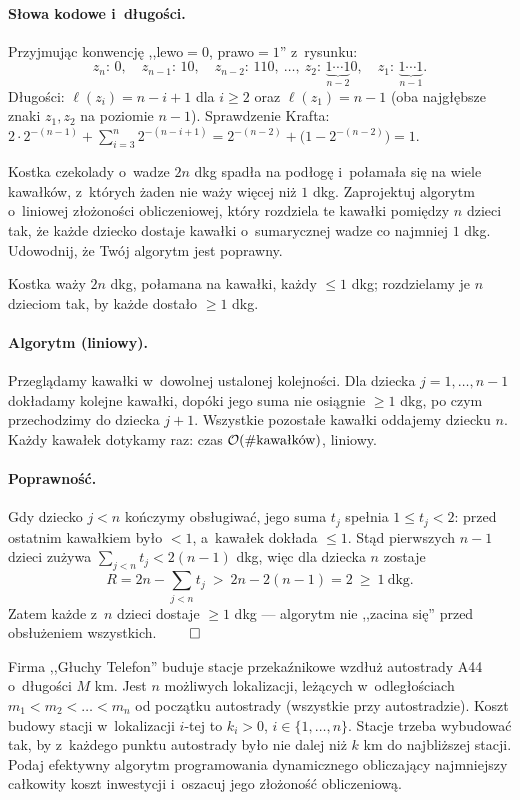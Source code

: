\paragraph{Słowa kodowe i~długości.}
Przyjmując konwencję ,,lewo${}=0$, prawo${}=1$'' z~rysunku:
\[
	z_n\!:\,0,\quad z_{n-1}\!:\,10,\quad z_{n-2}\!:\,110,\ \dots,\
	z_2\!:\,\underbrace{1\cdots1}_{n-2}0,\quad z_1\!:\,\underbrace{1\cdots1}_{n-1}.
\]
Długości: $\ell(z_i)=n-i+1$ dla $i\geq 2$ oraz $\ell(z_1)=n-1$ (oba najgłębsze
znaki $z_1,z_2$ na poziomie $n-1$). Sprawdzenie Krafta:
$2\cdot 2^{-(n-1)}+\sum_{i=3}^{n} 2^{-(n-i+1)}=2^{-(n-2)}+\big(1-2^{-(n-2)}\big)=1$.

\clearpage
\begin{zadanie}
	Kostka czekolady o~wadze $2n$ dkg spadła na podłogę i~połamała się na wiele
	kawałków, z~których żaden nie waży więcej niż $1$ dkg. Zaprojektuj algorytm
	o~liniowej złożoności obliczeniowej, który rozdziela te kawałki pomiędzy $n$
	dzieci tak, że każde dziecko dostaje kawałki o~sumarycznej wadze co najmniej
	$1$ dkg. Udowodnij, że Twój algorytm jest poprawny.
\end{zadanie}

Kostka waży $2n$ dkg, połamana na kawałki, każdy $\leq 1$ dkg; rozdzielamy je
$n$ dzieciom tak, by każde dostało $\geq 1$ dkg.

\paragraph{Algorytm (liniowy).}
Przeglądamy kawałki w~dowolnej ustalonej kolejności. Dla dziecka
$j=1,\dots,n-1$ dokładamy kolejne kawałki, dopóki jego suma nie osiągnie $\geq 1$
dkg, po czym przechodzimy do dziecka $j+1$. Wszystkie pozostałe kawałki oddajemy
dziecku $n$. Każdy kawałek dotykamy raz: czas $\mathcal{O}(\#\text{kawałków})$, liniowy.

\paragraph{Poprawność.}
Gdy dziecko $j<n$ kończymy obsługiwać, jego suma $t_j$ spełnia $1\leq t_j<2$:
przed ostatnim kawałkiem było $<1$, a~kawałek dokłada $\leq 1$. Stąd pierwszych
$n-1$ dzieci zużywa $\sum_{j<n} t_j<2(n-1)$ dkg, więc dla dziecka $n$ zostaje
\[
	R=2n-\sum_{j<n} t_j\ >\ 2n-2(n-1)=2\ \geq\ 1\ \text{dkg}.
\]
Zatem każde z~$n$ dzieci dostaje $\geq 1$ dkg --- algorytm nie ,,zacina się''
przed obsłużeniem wszystkich. $\qed$

\clearpage
\begin{zadanie}
	Firma ,,Głuchy Telefon'' buduje stacje przekaźnikowe wzdłuż autostrady A44
	o~długości $M$ km. Jest $n$ możliwych lokalizacji, leżących w~odległościach
	$m_1<m_2<\dots<m_n$ od początku autostrady (wszystkie przy autostradzie).
	Koszt budowy stacji w~lokalizacji $i$-tej to $k_i>0$, $i\in\{1,\dots,n\}$.
	Stacje trzeba wybudować tak, by z~każdego punktu autostrady było nie dalej niż
	$k$ km do najbliższej stacji. Podaj efektywny algorytm programowania
	dynamicznego obliczający najmniejszy całkowity koszt inwestycji i~oszacuj jego
	złożoność obliczeniową.
\end{zadanie}

